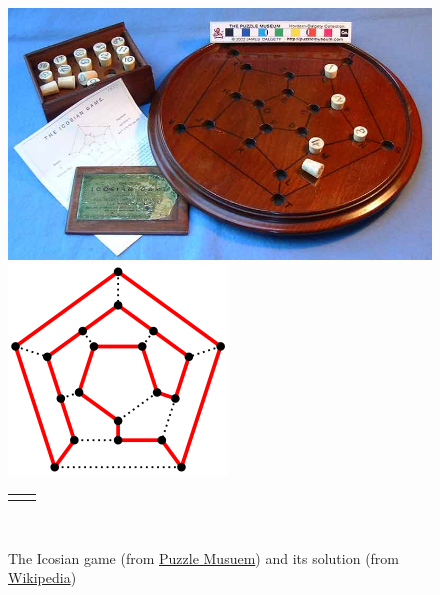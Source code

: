 \documentclass[10pt,]{book}
\theoremstyle{plain}
\theoremstyle{definition}
\theoremstyle{definition}
\theoremstyle{definition}
\theoremstyle{definition}
\numberwithin{equation}{section}
\newlength{\panelmax}
\begin{document}
\begin{figure}
\centering
{%
\setlength{\panelmax}{0pt}
\ifdefined\panelboxAimage\else\newsavebox{\panelboxAimage}\fi%
\begin{lrbox}{\panelboxAimage}
\includegraphics[width=0.4\linewidth]{images/icosiangame.jpg}
\end{lrbox}
\ifdefined\phAimage\else\newlength{\phAimage}\fi%
\setlength{\phAimage}{\ht\panelboxAimage+\dp\panelboxAimage}
\settototalheight{\phAimage}{\usebox{\panelboxAimage}}
\setlength{\panelmax}{\maxof{\panelmax}{\phAimage}}
\ifdefined\panelboxBimage\else\newsavebox{\panelboxBimage}\fi%
\begin{lrbox}{\panelboxBimage}
\includegraphics[width=0.4\linewidth]{images/icosiansolved.png}
\end{lrbox}
\ifdefined\phBimage\else\newlength{\phBimage}\fi%
\setlength{\phBimage}{\ht\panelboxBimage+\dp\panelboxBimage}
\settototalheight{\phBimage}{\usebox{\panelboxBimage}}
\setlength{\panelmax}{\maxof{\panelmax}{\phBimage}}
\leavevmode%
\setlength{\tabcolsep}{0.05\linewidth}
\par\medskip\noindent
\hspace*{0.05\linewidth}%
\begin{tabular}{@{}*{2}{c}@{}}
\begin{minipage}[c][\panelmax][c]{0.4\linewidth}\usebox{\panelboxAimage}\end{minipage}&
\begin{minipage}[c][\panelmax][c]{0.4\linewidth}\usebox{\panelboxBimage}\end{minipage}\end{tabular}\\
}%
\caption{The Icosian game (from \href{https://www.puzzlemuseum.com/month/picm02/200207icosian.htm}{Puzzle Musuem}) and its solution (from \href{https://en.wikipedia.org/wiki/Icosian_game}{Wikipedia})\label{figure-11}}
\end{figure}
\end{document}
